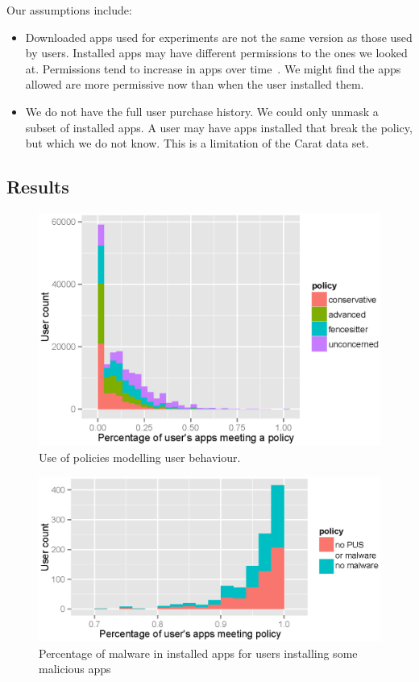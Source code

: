 \documentclass[]{soups-poster}
\newcommand{\citep}[1]{\cite{#1}}
\begin{document}
Our assumptions include:
\begin{itemize}
  \item 
    Downloaded apps used for experiments are not the same version as those used by users.
    Installed apps may have different permissions to the ones we looked at.
    Permissions tend to increase in apps over time~\citep{Wei:2012id}. 
    We might find the apps allowed are more permissive now than when the user installed them.

  \item We do not have the full user purchase history.
    We could only unmask a subset of installed apps.
    A user may have apps installed that break the policy, but which
    we do not know.  This is a limitation of the Carat data set.
\end{itemize}

\subsection{Results}

\begin{figure}[!ht]\centering
  \includegraphics[width=1.0\linewidth]{./tables/lin.eps}
  \caption{Use of policies modelling user behaviour.}
  \label{fig:lin}
\end{figure}

\begin{figure}[!ht]\centering
  \includegraphics[width=1.0\linewidth]{./tables/malware.eps}
  \caption{Percentage of malware in installed apps for users installing some malicious apps}
  \label{fig:malware}
\end{figure}
\end{document}
